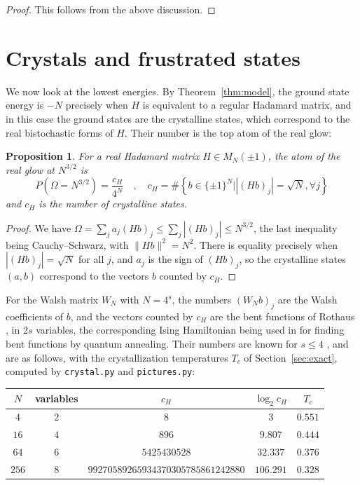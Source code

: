 \documentclass[11pt,a4paper]{article}
\newtheorem{prop}[thm]{Proposition}
\theoremstyle{remark}
\begin{document}
\begin{proof}
This follows from the above discussion.
\end{proof}

\section{Crystals and frustrated states}\label{sec:ground}

We now look at the lowest energies. By Theorem~\ref{thm:model}, the ground state energy is $-N$ precisely when $H$ is equivalent to a regular Hadamard matrix, and in this case the ground states are the crystalline states, which correspond to the real bistochastic forms of $H$. Their number is the top atom of the real glow:

\begin{samepage}
\begin{prop}\label{prop:atom}
For a real Hadamard matrix $H\in M_N(\pm1)$, the atom of the real glow at $N^{3/2}$ is
\[
 P(\Omega=N^{3/2})=\frac{c_H}{4^N}\quad,\quad c_H=\#\left\{b\in\{\pm1\}^N\Big||(Hb)_j|=\sqrt N,\forall j\right\}
\]
and $c_H$ is the number of crystalline states.
\end{prop}
\end{samepage}

\begin{proof}
We have $\Omega=\sum_ja_j(Hb)_j\leq\sum_j|(Hb)_j|\leq N^{3/2}$, the last inequality being Cauchy--Schwarz, with $\|Hb\|^2=N^2$. There is equality precisely when $|(Hb)_j|=\sqrt N$ for all $j$, and $a_j$ is the sign of $(Hb)_j$, so the crystalline states $(a,b)$ correspond to the vectors $b$ counted by $c_H$.
\end{proof}

For the Walsh matrix $W_N$ with $N=4^s$, the numbers $(W_Nb)_j$ are the Walsh coefficients of $b$, and the vectors counted by $c_H$ are the bent functions of Rothaus \cite{rot}, in $2s$ variables, the corresponding Ising Hamiltonian being used in \cite{hlr} for finding bent functions by quantum annealing. Their numbers are known for $s\leq4$ \cite{lle}, and are as follows, with the crystallization temperatures $T_c$ of Section~\ref{sec:exact}, computed by \texttt{crystal.py} and \texttt{pictures.py}:

\medskip

\begin{center}
\begin{tabular}{|c|c|c|c|c|}
\hline
$N$ & variables & $c_H$ & $\log_2c_H$ & $T_c$\\
\hline
$4$ & $2$ & $8$ & $3$ & $0.551$\\
$16$ & $4$ & $896$ & $9.807$ & $0.444$\\
$64$ & $6$ & $5425430528$ & $32.337$ & $0.376$\\
$256$ & $8$ & $99270589265934370305785861242880$ & $106.291$ & $0.328$\\
\hline
\end{tabular}
\end{center}
\end{document}
